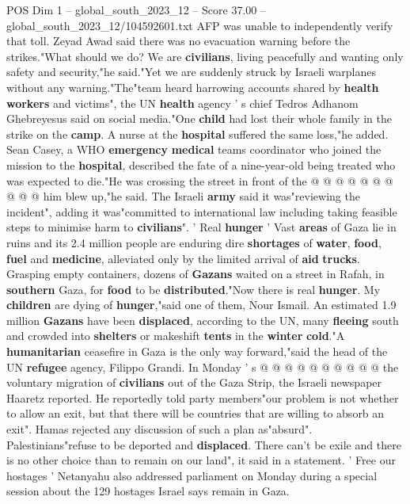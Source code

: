 \begin{textsample}{POS Dim 1 – global\_south\_2023\_12 – Score 37.00 – global\_south\_2023\_12/104592601.txt}
AFP was unable to independently verify that toll.
Zeyad Awad said there was no evacuation warning before the strikes."What should we do?
We are \textbf{civilians}, living peacefully and wanting only safety and security,"he said."Yet we are suddenly struck by Israeli warplanes without any warning."The"team heard harrowing accounts shared by \textbf{health} \textbf{workers} and victims", the UN \textbf{health} agency ' s chief Tedros Adhanom Ghebreyesus said on social media."One \textbf{child} had lost their whole family in the strike on the \textbf{camp}.
A nurse at the \textbf{hospital} suffered the same loss,"he added.
Sean Casey, a WHO \textbf{emergency} \textbf{medical} teams coordinator who joined the mission to the \textbf{hospital}, described the fate of a nine-year-old being treated who was expected to die."He was crossing the street in front of the @ @ @ @ @ @ @ @ @ @ him blew up,"he said.
The Israeli \textbf{army} said it was"reviewing the incident", adding it was"committed to international law including taking feasible steps to minimise harm to \textbf{civilians}". ' Real \textbf{hunger} ' Vast \textbf{areas} of Gaza lie in ruins and its 2.4 million people are enduring dire \textbf{shortages} of \textbf{water}, \textbf{food}, \textbf{fuel} and \textbf{medicine}, alleviated only by the limited arrival of \textbf{aid} \textbf{trucks}.
Grasping empty containers, dozens of \textbf{Gazans} waited on a street in Rafah, in \textbf{southern} Gaza, for \textbf{food} to be \textbf{distributed}."Now there is real \textbf{hunger}.
My \textbf{children} are dying of \textbf{hunger},"said one of them, Nour Ismail.
An estimated 1.9 million \textbf{Gazans} have been \textbf{displaced}, according to the UN, many \textbf{fleeing} south and crowded into \textbf{shelters} or makeshift \textbf{tents} in the \textbf{winter} \textbf{cold}."A \textbf{humanitarian} ceasefire in Gaza is the only way forward,"said the head of the UN \textbf{refugee} agency, Filippo Grandi.
In Monday ' s @ @ @ @ @ @ @ @ @ @ the voluntary migration of \textbf{civilians} out of the Gaza Strip, the Israeli newspaper Haaretz reported.
He reportedly told party members"our problem is not whether to allow an exit, but that there will be countries that are willing to absorb an exit".
Hamas rejected any discussion of such a plan as"absurd".
Palestinians"refuse to be deported and \textbf{displaced}.
There can't be exile and there is no other choice than to remain on our land", it said in a statement. ' Free our hostages ' Netanyahu also addressed parliament on Monday during a special session about the 129 hostages Israel says remain in Gaza.

\end{textsample}
